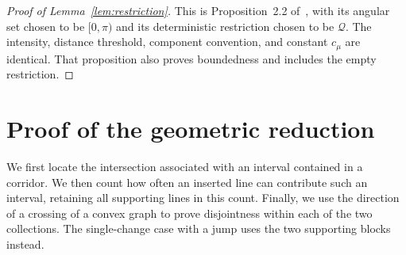 \documentclass[11pt,letterpaper]{article}
\begin{document}
\begin{proof}[Proof of Lemma~\ref{lem:restriction}]
This is Proposition~2.2 of~\cite{ORC26}, with its angular set chosen to be $[0,\pi)$ and its deterministic restriction chosen to be $\mathscr Q$. The intensity, distance threshold, component convention, and constant $c_\mu$ are identical. That proposition also proves boundedness and includes the empty restriction.
\end{proof}

\section{Proof of the geometric reduction}

We first locate the intersection associated with an interval contained in a corridor. We then count how often an inserted line can contribute such an interval, retaining all supporting lines in this count. Finally, we use the direction of a crossing of a convex graph to prove disjointness within each of the two collections. The single-change case with a jump uses the two supporting blocks instead.
\end{document}
